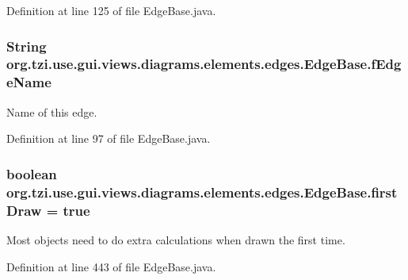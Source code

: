Definition at line 125 of file Edge\-Base.\-java.

\hypertarget{classorg_1_1tzi_1_1use_1_1gui_1_1views_1_1diagrams_1_1elements_1_1edges_1_1_edge_base_aeb64aab993f2f342aaf2dd5d030563cf}{
\subsubsection[{f\-Edge\-Name}]{\setlength{\rightskip}{0pt plus 5cm}String org.\-tzi.\-use.\-gui.\-views.\-diagrams.\-elements.\-edges.\-Edge\-Base.\-f\-Edge\-Name\hspace{0.3cm}{\ttfamily [protected]}}}\label{classorg_1_1tzi_1_1use_1_1gui_1_1views_1_1diagrams_1_1elements_1_1edges_1_1_edge_base_aeb64aab993f2f342aaf2dd5d030563cf}
Name of this edge. 

Definition at line 97 of file Edge\-Base.\-java.

\hypertarget{classorg_1_1tzi_1_1use_1_1gui_1_1views_1_1diagrams_1_1elements_1_1edges_1_1_edge_base_a55811070bdecddd9a7d72637c96aaaa1}{
\subsubsection[{first\-Draw}]{\setlength{\rightskip}{0pt plus 5cm}boolean org.\-tzi.\-use.\-gui.\-views.\-diagrams.\-elements.\-edges.\-Edge\-Base.\-first\-Draw = true\hspace{0.3cm}{\ttfamily [protected]}}}\label{classorg_1_1tzi_1_1use_1_1gui_1_1views_1_1diagrams_1_1elements_1_1edges_1_1_edge_base_a55811070bdecddd9a7d72637c96aaaa1}
Most objects need to do extra calculations when drawn the first time. 

Definition at line 443 of file Edge\-Base.\-java.

